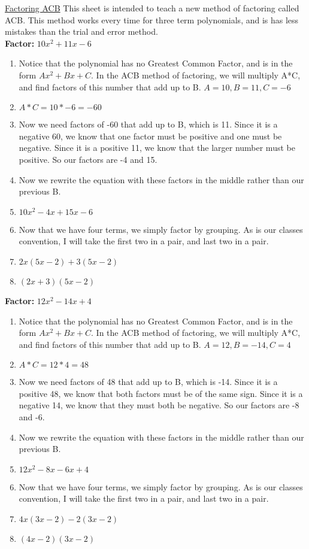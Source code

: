 \documentclass{article}
\begin{document}
\newpage
\underline{Factoring ACB}
This sheet is intended to teach a new method of factoring called ACB. This method works every time for three term polynomials, and is has less mistakes than the trial and error method. \\
\textbf{Factor:} $10x^{2} + 11x -6$
\begin{enumerate}
  \item Notice that the polynomial has no Greatest Common Factor, and is in the form $Ax^{2} + Bx + C$. In the ACB method of factoring, we will multiply A*C, and find factors of this number that add up to B. $A=10, B=11, C=-6$
  \item[] $A*C = 10*-6 = -60$
  \item Now we need factors of -60 that add up to B, which is 11. Since it is a negative 60, we know that one factor must be positive and one must be negative. Since it is a positive 11, we know that the larger number must be positive. So our factors are -4 and 15.
  \item Now we rewrite the equation with these factors in the middle rather than our previous B.
  \item[] $10x^{2} -4x + 15x -6$
  \item Now that we have four terms, we simply factor by grouping. As is our classes convention, I will take the first two in a pair, and last two in a pair.
  \item[] $2x(5x-2) + 3(5x-2)$
  \item[] $(2x+3)(5x-2)$
\end{enumerate}
\textbf{Factor:} $12x^{2} - 14x + 4$
\begin{enumerate}
  \item Notice that the polynomial has no Greatest Common Factor, and is in the form $Ax^{2} + Bx + C$. In the ACB method of factoring, we will multiply A*C, and find factors of this number that add up to B. $A=12, B=-14, C=4$
  \item[] $A*C = 12*4 = 48$
  \item Now we need factors of 48 that add up to B, which is -14. Since it is a positive 48, we know that both factors must be of the same sign. Since it is a negative 14, we know that they must both be negative. So our factors are -8 and -6.
  \item Now we rewrite the equation with these factors in the middle rather than our previous B.
  \item[] $12x^{2} - 8x - 6x +4$
  \item Now that we have four terms, we simply factor by grouping. As is our classes convention, I will take the first two in a pair, and last two in a pair.
  \item[] $4x(3x-2) - 2(3x-2)$
  \item[] $(4x-2)(3x-2)$
\end{enumerate}
\end{document}
